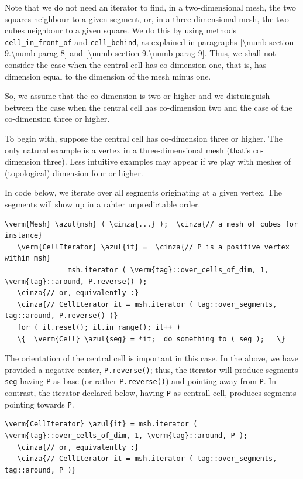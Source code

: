 Note that we do not need an iterator to find, in a two-dimensional mesh, the two squares
neighbour to a given segment, or, in a three-dimensional mesh, the two cubes neighbour to
a given square.
We do this by using methods {\small\tt cell\_in\_front\_of} and {\small\tt cell\_behind},
as explained in paragraphs \ref{\numb section 9.\numb parag 8} and
\ref{\numb section 9.\numb parag 9}.
Thus, we shall not consider the case when the central cell has co-dimension one, that is,
has dimension equal to the dimension of the mesh minus one.

So, we assume that the co-dimension is two or higher and we distuinguish between
the case when the central cell has co-dimension two and the case of the co-dimension
three or higher.

To begin with, suppose the central cell has co-dimension three or higher.
The only natural example is a vertex in a three-dimensional mesh (that's co-dimension three).
Less intuitive examples may appear if we play with meshes of (topological) dimension
four or higher.

In code below, we iterate over all segments originating at a given vertex.
The segments will show up in a rahter unpredictable order.

\begin{Verbatim}[commandchars=\\\{\},formatcom=\small\tt,
   baselinestretch=0.94,framesep=2mm                      ]
   \verm{Mesh} \azul{msh} ( \cinza{...} );  \cinza{// a mesh of cubes for instance}
   \verm{CellIterator} \azul{it} =  \cinza{// P is a positive vertex within msh}
               msh.iterator ( \verm{tag}::over_cells_of_dim, 1, \verm{tag}::around, P.reverse() );
   \cinza{// or, equivalently :}
   \cinza{// CellIterator it = msh.iterator ( tag::over_segments, tag::around, P.reverse() )}
   for ( it.reset(); it.in_range(); it++ )
   \{  \verm{Cell} \azul{seg} = *it;  do_something_to ( seg );   \}
\end{Verbatim}

The orientation of the central cell is important in this case.
In the above, we have provided a negative center, {\small\tt P.reverse()};
thus, the iterator will produce segments {\small\tt seg} having {\small\tt P} as base
(or rather {\small\tt P.reverse()}) and pointing away from {\small\tt P}.
In contrast, the iterator declared below, having {\small\tt P} as centrall cell,
produces segments pointing towards {\small\tt P}.

\begin{Verbatim}[commandchars=\\\{\},formatcom=\small\tt,
   baselinestretch=0.94,framesep=2mm                      ]
   \verm{CellIterator} \azul{it} = msh.iterator ( \verm{tag}::over_cells_of_dim, 1, \verm{tag}::around, P );
   \cinza{// or, equivalently :}
   \cinza{// CellIterator it = msh.iterator ( tag::over_segments, tag::around, P )}
\end{Verbatim}

